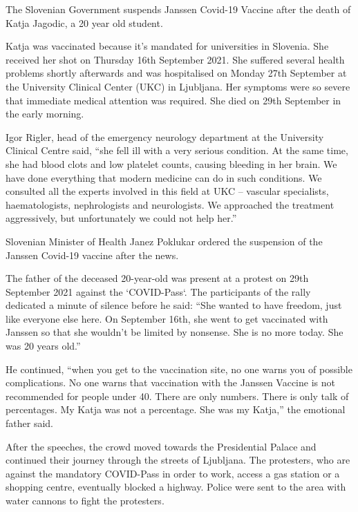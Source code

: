 The Slovenian Government suspends Janssen Covid-19 Vaccine after the death of
Katja Jagodic, a 20 year old student.

Katja was vaccinated because it’s mandated for universities in Slovenia. She
received her shot on Thursday 16th September 2021. She suffered several health
problems shortly afterwards and was hospitalised on Monday 27th September at the
University Clinical Center (UKC) in Ljubljana. Her symptoms were so severe that
immediate medical attention was required. She died on 29th September in the
early morning.

Igor Rigler, head of the emergency neurology department at the University
Clinical Centre said, “she fell ill with a very serious condition. At the same
time, she had blood clots and low platelet counts, causing bleeding in her
brain. We have done everything that modern medicine can do in such
conditions. We consulted all the experts involved in this field at UKC –
vascular specialists, haematologists, nephrologists and neurologists. We
approached the treatment aggressively, but unfortunately we could not help her.”

Slovenian Minister of Health Janez Poklukar ordered the suspension of the
Janssen Covid-19 vaccine after the news.

The father of the deceased 20-year-old was present at a protest on 29th
September 2021 against the ‘COVID-Pass‘. The participants of the rally dedicated
a minute of silence before he said: “She wanted to have freedom, just like
everyone else here. On September 16th, she went to get vaccinated with Janssen
so that she wouldn’t be limited by nonsense. She is no more today. She was 20
years old.”

He continued, “when you get to the vaccination site, no one warns you of
possible complications. No one warns that vaccination with the Janssen Vaccine
is not recommended for people under 40. There are only numbers. There is only
talk of percentages. My Katja was not a percentage. She was my Katja,” the
emotional father said.

After the speeches, the crowd moved towards the Presidential Palace and
continued their journey through the streets of Ljubljana. The protesters, who
are against the mandatory COVID-Pass in order to work, access a gas station or a
shopping centre, eventually blocked a highway. Police were sent to the area with
water cannons to fight the protesters.


